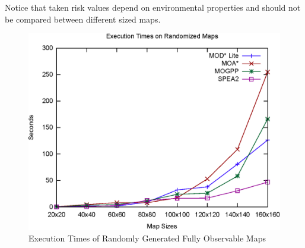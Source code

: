 \documentclass[10pt,journal]{IEEEtran}
\begin{document}
Notice that taken risk values depend on environmental properties and should not be compared between different sized maps.

\begin{figure}
\centering
\includegraphics[scale=0.45]{experimental/randomized}
\caption{Execution Times of Randomly Generated Fully Observable Maps}
\label{fig:rand_fully}
\end{figure}
\end{document}
